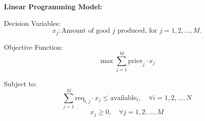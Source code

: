 \documentclass{article}
\begin{document}
\textbf{Linear Programming Model:}

Decision Variables:
\[
x_j: \text{Amount of good } j \text{ produced, for } j = 1, 2, \ldots, M.
\]

Objective Function:
\[
\max \sum_{j=1}^{M} \text{price}_j \cdot x_j
\]

Subject to:
\[
\sum_{j=1}^{M} \text{req}_{i,j} \cdot x_j \leq \text{available}_i, \quad \forall i = 1, 2, \ldots, N
\]
\[
x_j \geq 0, \quad \forall j = 1, 2, \ldots, M
\]
\end{document}

